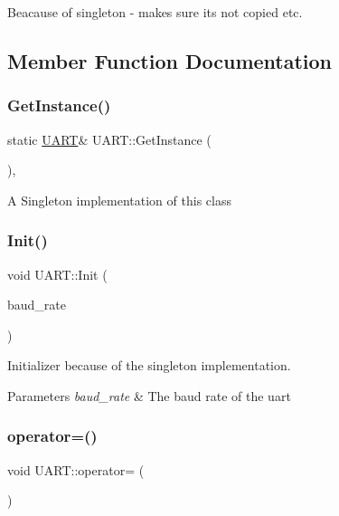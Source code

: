 Beacause of singleton -\/ makes sure its not copied etc. 

\subsection{Member Function Documentation}
\hypertarget{class_u_a_r_t_a745c8f35f3ca3ab6359cedda3e640777}{}\label{class_u_a_r_t_a745c8f35f3ca3ab6359cedda3e640777} 
\subsubsection{\texorpdfstring{Get\+Instance()}{GetInstance()}}
{\footnotesize\ttfamily static \hyperlink{class_u_a_r_t}{U\+A\+RT}\& U\+A\+R\+T\+::\+Get\+Instance (\begin{DoxyParamCaption}{ }\end{DoxyParamCaption})\hspace{0.3cm}{\ttfamily [inline]}, {\ttfamily [static]}}

A Singleton implementation of this class \hypertarget{class_u_a_r_t_aed659ee8bc31ba966144d1a522506a7b}{}\label{class_u_a_r_t_aed659ee8bc31ba966144d1a522506a7b} 
\subsubsection{\texorpdfstring{Init()}{Init()}}
{\footnotesize\ttfamily void U\+A\+R\+T\+::\+Init (\begin{DoxyParamCaption}\item[{uint16\+\_\+t}]{baud\+\_\+rate }\end{DoxyParamCaption})}

Initializer because of the singleton implementation. 
\begin{DoxyParams}{Parameters}
{\em baud\+\_\+rate} & The baud rate of the uart \\
\hline
\end{DoxyParams}
\hypertarget{class_u_a_r_t_a843ab7fc20f5ce5f030d2ca5ee98d6b6}{}\label{class_u_a_r_t_a843ab7fc20f5ce5f030d2ca5ee98d6b6} 
\subsubsection{\texorpdfstring{operator=()}{operator=()}}
{\footnotesize\ttfamily void U\+A\+R\+T\+::operator= (\begin{DoxyParamCaption}\item[{const \hyperlink{class_u_a_r_t}{U\+A\+RT} \&}]{ }\end{DoxyParamCaption})\hspace{0.3cm}{\ttfamily [delete]}}

